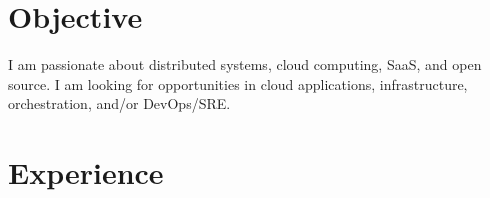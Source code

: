 \documentclass[]{cv-style}                     %
\begin{document}

\section{Objective}

I am passionate about distributed systems, cloud computing, SaaS, and open source.
I am looking for opportunities in cloud applications, infrastructure, orchestration, and/or DevOps/SRE.



\section{Experience}
\end{document}
